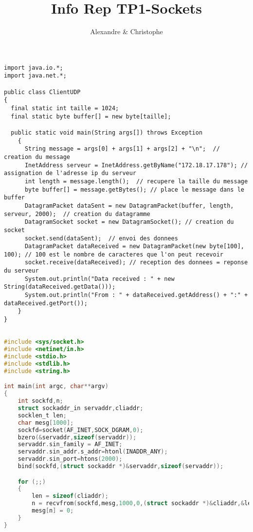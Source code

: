 \documentclass{article}
\title{Info Rep TP1-Sockets}
\author{Alexandre \bsc{Brehmer} \& Christophe \bsc{Cluizel}}
\begin{document}
\maketitle

\begin{lstlisting}
import java.io.*;
import java.net.*;

public class ClientUDP
{
  final static int taille = 1024;
  final static byte buffer[] = new byte[taille];

  public static void main(String args[]) throws Exception
    {
      String message = args[0] + args[1] + args[2] + "\n";  // creation du message
      InetAddress serveur = InetAddress.getByName("172.18.17.178"); // assignation de l'adresse ip du serveur
      int length = message.length();  // recupere la taille du message
      byte buffer[] = message.getBytes(); // place le message dans le buffer
      DatagramPacket dataSent = new DatagramPacket(buffer, length, serveur, 2000);  // creation du datagramme
      DatagramSocket socket = new DatagramSocket(); // creation du socket
      socket.send(dataSent);  // envoi des donnees
      DatagramPacket dataReceived = new DatagramPacket(new byte[100], 100); // 100 est le nombre de caracteres que l'on peut recevoir
      socket.receive(dataReceived); // reception des donnees = reponse du serveur
      System.out.println("Data received : " + new String(dataReceived.getData()));
      System.out.println("From : " + dataReceived.getAddress() + ":" + dataReceived.getPort());
    }
}
\end{lstlisting}

\begin{lstlisting}[language=c]

#include <sys/socket.h>
#include <netinet/in.h>
#include <stdio.h>
#include <stdlib.h>
#include <string.h>

int main(int argc, char**argv)
{
    int sockfd,n;
    struct sockaddr_in servaddr,cliaddr;
    socklen_t len;
    char mesg[1000];
    sockfd=socket(AF_INET,SOCK_DGRAM,0);
    bzero(&servaddr,sizeof(servaddr));
    servaddr.sin_family = AF_INET;
    servaddr.sin_addr.s_addr=htonl(INADDR_ANY);
    servaddr.sin_port=htons(2000);
    bind(sockfd,(struct sockaddr *)&servaddr,sizeof(servaddr));

    for (;;)
    {
        len = sizeof(cliaddr);
        n = recvfrom(sockfd,mesg,1000,0,(struct sockaddr *)&cliaddr,&len);
        mesg[n] = 0;
    }
}
\end{lstlisting}
\end{document}
